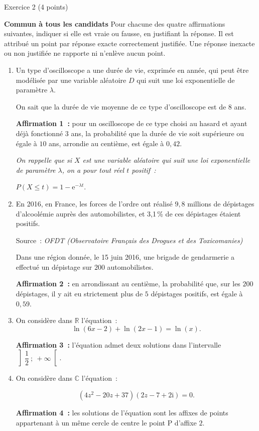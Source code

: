 
%
\begin{h2}Exercice 2 (4 points)\end{h2}
\textbf{Commun à  tous les candidats}
\medbreak
Pour chacune des quatre affirmations suivantes, indiquer si elle est vraie ou fausse, en justifiant la
réponse. Il est attribué un point par réponse exacte correctement justifiée. Une réponse inexacte ou
non justifiée ne rapporte ni n'enlève aucun point.
\par
\begin{enumerate}
     \item Un type d'oscilloscope a une durée de vie, exprimée en année, qui peut être modélisée par une
     variable aléatoire $D$ qui suit une loi exponentielle de paramètre $\lambda$.
     \par
     On sait que la durée de vie moyenne de ce type d'oscilloscope est de $8$ ans.
     \par
     \textbf{Affirmation 1~:} pour un oscilloscope de ce type choisi au hasard et ayant déjà fonctionné $3$ ans,
     la probabilité que la durée de vie soit supérieure ou égale à $10$ ans, arrondie au centième, est
     égale à $0,42$.
     \par
     \emph{On rappelle que si $X$ est une variable aléatoire qui suit une loi exponentielle de paramètre $\lambda$, on a pour tout réel $t$ positif~:}
     \begin{center}
          $P(X \leqslant t) = 1 - \text{e}^{-\lambda t}$.
     \end{center}
     \item  En 2016, en France, les forces de l'ordre ont réalisé $9,8$ millions de dépistages d'alcoolémie
     auprès des automobilistes, et 3,1\,\% de ces dépistages étaient positifs.
     \par
     Source~: \emph{OFDT (Observatoire Français des Drogues et des Toxicomanies)}
     \par
     Dans une région donnée, le 15 juin 2016, une brigade de gendarmerie a effectué un dépistage
     sur $200$ automobilistes.
     \par
     \textbf{Affirmation 2~:} en arrondissant au centième, la probabilité que, sur les $200$ dépistages, il y ait
     eu strictement plus de $5$ dépistages positifs, est égale à $0,59$.
     \item  On considère dans $\mathbb{R}$ l'équation~:
     \[\ln (6 x - 2) + \ln (2x - 1) = \ln (x).\]
     \par
     \textbf{Affirmation 3~:} l'équation admet deux solutions dans l'intervalle $\left]\dfrac{1}{2}~;~+ \infty\right[$.
     \item  On considère dans $\mathbb{C}$ l'équation~:
     \par
     \[\left(4z^2 - 20z + 37\right)(2z -7 + 2\text{i}) = 0.\]
     \par
     \textbf{Affirmation 4~:} les solutions de l'équation sont les affixes de points appartenant à un même
     cercle de centre le point P d'affixe $2$.
\end{enumerate}
